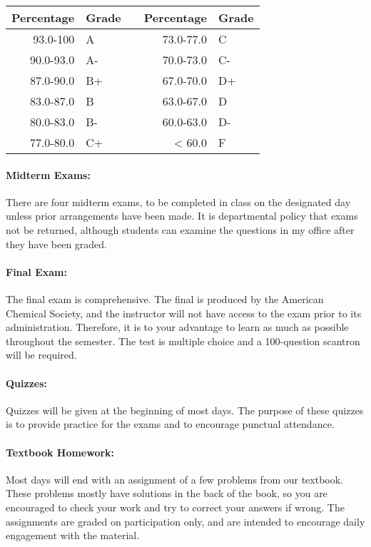 \documentclass[12pt, letterpaper]{article}
\begin{document}
\begin{tabular}{rl|c|rl}
	Percentage & Grade &  & Percentage & Grade \\ \midrule
	  93.0-100 & A     &  &  73.0-77.0 & C     \\
	 90.0-93.0 & A-    &  &  70.0-73.0 & C-    \\
	 87.0-90.0 & B+    &  &  67.0-70.0 & D+    \\
	 83.0-87.0 & B     &  &  63.0-67.0 & D     \\
	 80.0-83.0 & B-    &  &  60.0-63.0 & D-    \\
	 77.0-80.0 & C+    &  &     < 60.0 & F
\end{tabular}
\paragraph{Midterm Exams:}
There are four midterm exams, to be completed in class on the designated day unless prior arrangements have been made. It is departmental policy that exams not be returned, although students can examine the questions in my office after they have been graded.

\paragraph{Final Exam:}
The final exam is comprehensive. The final is produced by the American Chemical Society, and the instructor will not have access to the exam prior to its administration. Therefore, it is to your advantage to learn as much as possible throughout the semester. The test is multiple choice and a 100-question scantron will be required.

\paragraph{Quizzes:}
Quizzes will be given at the beginning of most days. The purpose of these quizzes is to provide practice for the exams and to encourage punctual attendance.

\paragraph{Textbook Homework:}
Most days will end with an assignment of a few problems from our textbook. These problems mostly have solutions in the back of the book, so you are encouraged to check your work and try to correct your answers if wrong. The assignments are graded on participation only, and are intended to encourage daily engagement with the material.
\end{document}
